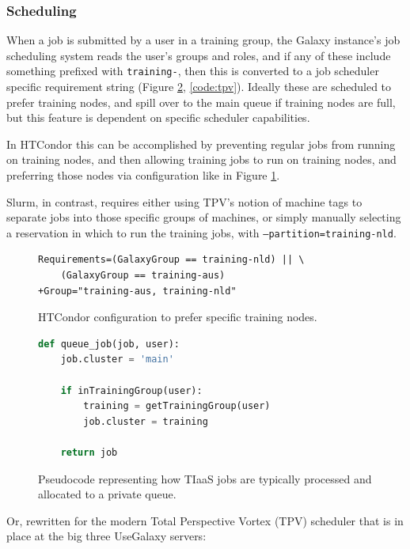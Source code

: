 \documentclass[a4paper,num-refs]{oup-contemporary}
\begin{document}
\subsubsection{Scheduling}
When a job is submitted by a user in a training group, the Galaxy instance's job scheduling system reads the user's groups and roles, and if any of these include something prefixed with \texttt{training-}, then this is converted to a job scheduler specific requirement string (Figure \ref{code:scheduler}, \ref{code:tpv}). Ideally these are scheduled to prefer training nodes, and spill over to the main queue if training nodes are full, but this feature is dependent on specific scheduler capabilities. 

In HTCondor this can be accomplished by preventing regular jobs from running on training nodes, and then allowing training jobs to run on training nodes, and preferring those nodes via configuration like in Figure \ref{code:condorprefer}.

Slurm, in contrast, requires either using TPV's notion of machine tags to separate jobs into those specific groups of machines, or simply manually selecting a reservation in which to run the training jobs, with \texttt{--partition=training-nld}.

\begin{figure}[!ht]
\centering
\begin{lstlisting}[frame=single]  % Start your code-block
Requirements=(GalaxyGroup == training-nld) || \
    (GalaxyGroup == training-aus)
+Group="training-aus, training-nld"
\end{lstlisting}
\caption{HTCondor configuration to prefer specific training nodes.\label{code:condorprefer}}
\end{figure}



\begin{figure}[!ht]
\centering
\begin{lstlisting}[frame=single,language=Python]  % Start your code-block
def queue_job(job, user):
    job.cluster = 'main'

    if inTrainingGroup(user):
        training = getTrainingGroup(user)
        job.cluster = training

    return job
\end{lstlisting}
\caption{Pseudocode representing how TIaaS jobs are typically processed and allocated to a private queue.\label{code:scheduler}}
\end{figure}

Or, rewritten for the modern Total Perspective Vortex (TPV) scheduler that is in place at the big three UseGalaxy servers:
\end{document}
